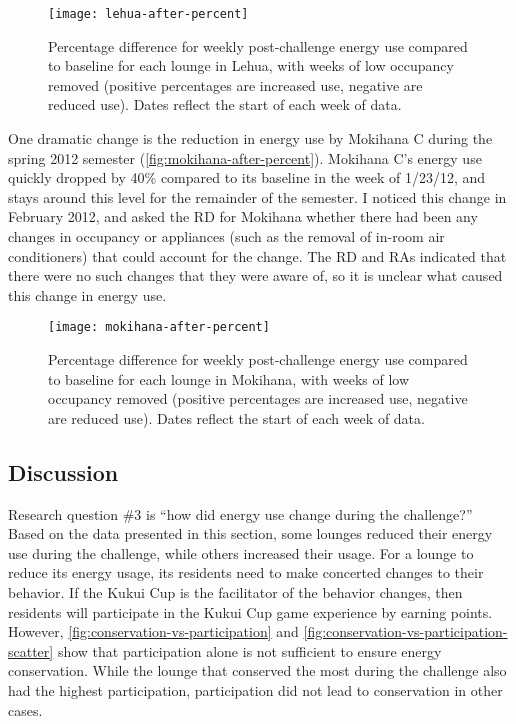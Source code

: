\begin{figure}[htbp]
	\centering
	\texttt{[image: lehua-after-percent]}
	\caption[Percentage post-challenge energy use difference from baseline for Lehua]{Percentage difference for weekly post-challenge energy use compared to baseline for each lounge in Lehua, with weeks of low occupancy removed (positive percentages are increased use, negative are reduced use). Dates reflect the start of each week of data.}
	\label{fig:lehua-after-percent}
\end{figure}

One dramatic change is the reduction in energy use by Mokihana C during the spring 2012 semester (\autoref{fig:mokihana-after-percent}). Mokihana C's energy use quickly dropped by 40\% compared to its baseline in the week of 1/23/12, and stays around this level for the remainder of the semester. I noticed this change in February 2012, and asked the RD for Mokihana whether there had been any changes in occupancy or appliances (such as the removal of in-room air conditioners) that could account for the change. The RD and RAs indicated that there were no such changes that they were aware of, so it is unclear what caused this change in energy use.

\begin{figure}[htbp]
	\centering
	\texttt{[image: mokihana-after-percent]}
	\caption[Percentage post-challenge energy use difference from baseline for Mokihana]{Percentage difference for weekly post-challenge energy use compared to baseline for each lounge in Mokihana, with weeks of low occupancy removed (positive percentages are increased use, negative are reduced use). Dates reflect the start of each week of data.}
	\label{fig:mokihana-after-percent}
\end{figure}


\subsection{Discussion}
\label{sec:energy-result-discussion}

Research question \#3 is ``how did energy use change during the challenge?'' Based on the data presented in this section, some lounges reduced their energy use during the challenge, while others increased their usage. For a lounge to reduce its energy usage, its residents need to make concerted changes to their behavior. If the Kukui Cup is the facilitator of the behavior changes, then residents will participate in the Kukui Cup game experience by earning points. However, \autoref{fig:conservation-vs-participation} and \autoref{fig:conservation-vs-participation-scatter} show that participation alone is not sufficient to ensure energy conservation. While the lounge that conserved the most during the challenge also had the highest participation, participation did not lead to conservation in other cases.

